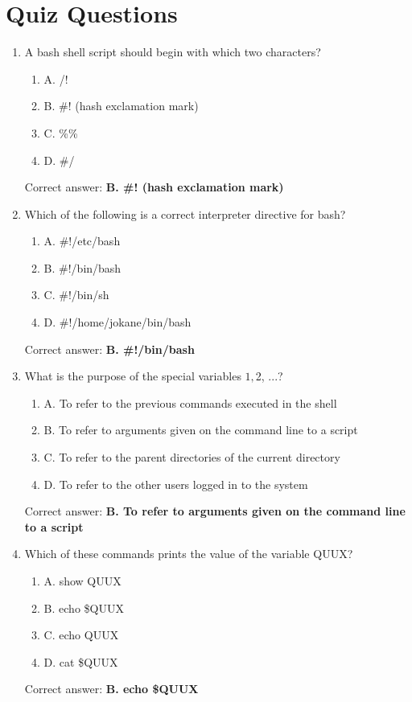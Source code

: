 \documentclass{article}
\begin{document}
\section*{Quiz Questions}

\begin{enumerate}
    \item A bash shell script should begin with which two characters?
    \begin{enumerate}
        \item A. /!
        \item B. \#! (hash exclamation mark)
        \item C. \%\%
        \item D. \#/
    \end{enumerate}
    Correct answer: \textbf{B. \#! (hash exclamation mark)}

    \item Which of the following is a correct interpreter directive for bash?
    \begin{enumerate}
        \item A. \#!/etc/bash
        \item B. \#!/bin/bash
        \item C. \#!/bin/sh
        \item D. \#!/home/jokane/bin/bash
    \end{enumerate}
    Correct answer: \textbf{B. \#!/bin/bash}

    \item What is the purpose of the special variables $1, $2, ...?
    \begin{enumerate}
        \item A. To refer to the previous commands executed in the shell
        \item B. To refer to arguments given on the command line to a script
        \item C. To refer to the parent directories of the current directory
        \item D. To refer to the other users logged in to the system
    \end{enumerate}
    Correct answer: \textbf{B. To refer to arguments given on the command line to a script}

    \item Which of these commands prints the value of the variable QUUX?
    \begin{enumerate}
        \item A. show QUUX
        \item B. echo \$QUUX
        \item C. echo QUUX
        \item D. cat \$QUUX
    \end{enumerate}
    Correct answer: \textbf{B. echo \$QUUX}


\end{enumerate}
\end{document}
